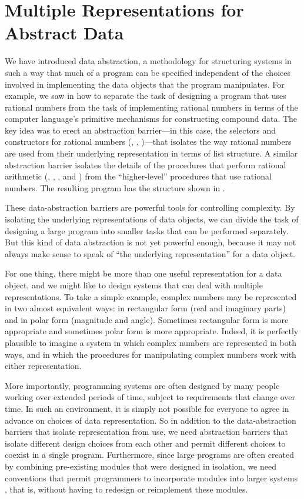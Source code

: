 \section{Multiple Representations for Abstract Data}
\label{Section 2.4}

We have introduced data abstraction, a methodology for structuring systems in
such a way that much of a program can be specified independent of the choices
involved in implementing the data objects that the program manipulates.  For
example, we saw in  how to separate the task of designing a
program that uses rational numbers from the task of implementing rational
numbers in terms of the computer language's primitive mechanisms for
constructing compound data.  The key idea was to erect an abstraction
barrier---in this case, the selectors and constructors for rational numbers
(, , )---that isolates the way rational
numbers are used from their underlying representation in terms of list
structure.  A similar abstraction barrier isolates the details of the
procedures that perform rational arithmetic (, ,
, and ) from the ``higher-level'' procedures that
use rational numbers.  The resulting program has the structure shown in
.

These data-abstraction barriers are powerful tools for controlling complexity.
By isolating the underlying representations of data objects, we can divide the
task of designing a large program into smaller tasks that can be performed
separately.  But this kind of data abstraction is not yet powerful enough,
because it may not always make sense to speak of ``the underlying
representation'' for a data object.

For one thing, there might be more than one useful representation for a data
object, and we might like to design systems that can deal with multiple
representations.  To take a simple example, complex numbers may be represented
in two almost equivalent ways: in rectangular form (real and imaginary parts)
and in polar form (magnitude and angle).  Sometimes rectangular form is more
appropriate and sometimes polar form is more appropriate.  Indeed, it is
perfectly plausible to imagine a system in which complex numbers are
represented in both ways, and in which the procedures for manipulating complex
numbers work with either representation.

More importantly, programming systems are often designed by many people working
over extended periods of time, subject to requirements that change over time.
In such an environment, it is simply not possible for everyone to agree in
advance on choices of data representation.  So in addition to the
data-abstraction barriers that isolate representation from use, we need
abstraction barriers that isolate different design choices from each other and
permit different choices to coexist in a single program.  Furthermore, since
large programs are often created by combining pre-existing modules that were
designed in isolation, we need conventions that permit programmers to
incorporate modules into larger systems , that is, without
having to redesign or reimplement these modules.

